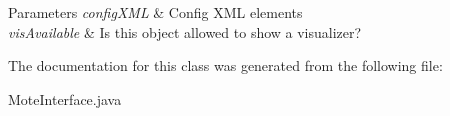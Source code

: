 \begin{DoxyParams}{Parameters}
{\em config\-X\-M\-L} & Config X\-M\-L elements \\
\hline
{\em vis\-Available} & Is this object allowed to show a visualizer? \\
\hline
\end{DoxyParams}


The documentation for this class was generated from the following file\-:\begin{DoxyCompactItemize}
\item 
Mote\-Interface.\-java\end{DoxyCompactItemize}
